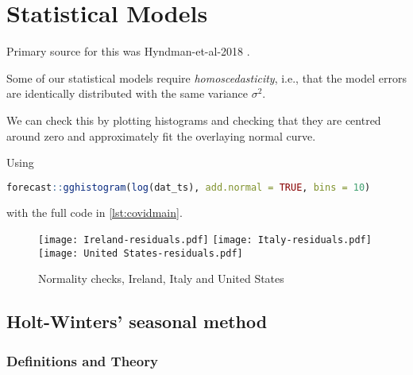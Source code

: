 \section{Statistical Models}
\label{ch:statmodel}

Primary source for this was Hyndman-et-al-2018 \cite{Hyndman-et-al-2018}.

Some of our statistical models require \textit{homoscedasticity}, i.e., that the model errors are identically distributed with the same variance $\sigma^2$.

We can check this by plotting histograms and checking that they are centred around zero and approximately fit the overlaying normal curve. 

Using 

\begin{lstlisting}[language = R] 
forecast::gghistogram(log(dat_ts), add.normal = TRUE, bins = 10) 
\end{lstlisting}

with the full code in \ref{lst:covidmain}.

\begin{figure}[H]
  \texttt{[image: Ireland-residuals.pdf]} \label{fig:ireland-residuals}
\endminipage\hfill
{}
  \texttt{[image: Italy-residuals.pdf]} \label{fig:italy-residuals}
\endminipage\hfill
{}
  \texttt{[image: United States-residuals.pdf]} \label{fig:usa-residuals}
\endminipage\hfill
\caption{Normality checks, Ireland, Italy and United States}
\end{figure}

\subsection{Holt-Winters’ seasonal method}

\subsubsection{Definitions and Theory}

